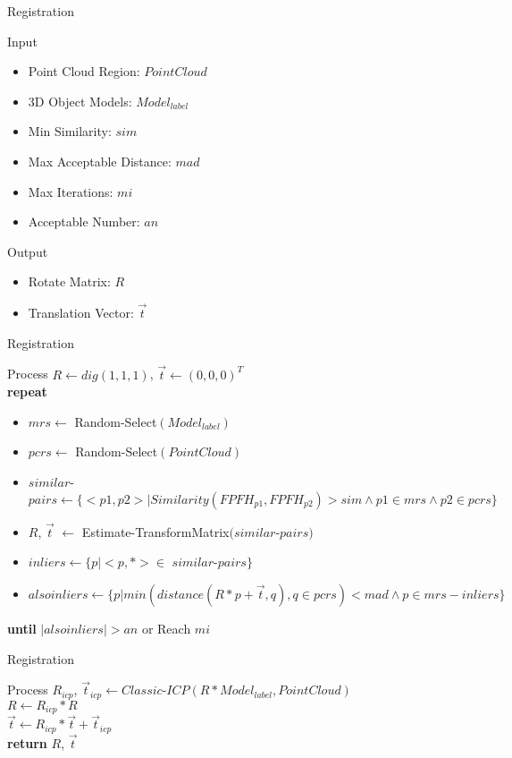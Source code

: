 \documentclass[xcolor=table,compress,blue]{beamer}
\begin{document}
\begin{frame}{Registration}
	\begin{exampleblock}{Input}
		\begin{itemize}		
			\item  Point Cloud Region: $Point Cloud$
			\item  3D Object Models: $Model_{label}$
			\item  Min Similarity: $sim$
			\item  Max Acceptable Distance: $mad$
			\item  Max Iterations: $mi$ 
			\item  Acceptable Number: $an$
		\end{itemize}
	\end{exampleblock}
	\begin{exampleblock}{Output}
		\begin{itemize}
			\item Rotate Matrix: $R$
			\item Translation Vector: $\vec t$ 
		\end{itemize}
	\end{exampleblock}
\end{frame}

\begin{frame}{Registration}
	\begin{exampleblock}{Process}
		$R\leftarrow dig(1,1,1)$, $\vec t\leftarrow (0,0,0)^T$ 
		\\ \textbf{repeat} 
		\begin{itemize}
		\item $mrs \leftarrow $ Random-Select$(Model_{label})$
		\item $pcrs \leftarrow$ Random-Select$(Point Cloud)$
		\item $similar$-$pairs \leftarrow \{<p1,p2>|Similarity(FPFH_{p1},FPFH_{p2})>sim  \wedge p1 \in mrs \wedge p2 \in pcrs\}$
		\item $R$, $\vec t$ $\leftarrow$ Estimate-TransformMatrix$(similar$-$pairs)$
		\item $inliers \leftarrow \{p| <p,*> \in $ $similar$-$pairs\}$
		\item $alsoinliers \leftarrow \{p| min (distance(R*p+\vec t,q), q\in pcrs) < mad \wedge p \in mrs-inliers \}$
		\end{itemize}
		\textbf{until} \quad $|alsoinliers| > an$ or Reach $mi$
	\end{exampleblock}
\end{frame}
\begin{frame}{Registration}
	\begin{exampleblock}{Process}
		$R_{icp}$, $\vec t_{icp} \leftarrow Classic$-$ICP(R * Model_{label}, Point Cloud)$
		\\ $R \leftarrow R_{icp} * R$
		\\ $\vec t \leftarrow R_{icp} * \vec t + \vec t_{icp}$
		\\ \textbf{return} $R$, $\vec t$
	\end{exampleblock}
\end{frame}	
\end{document}
